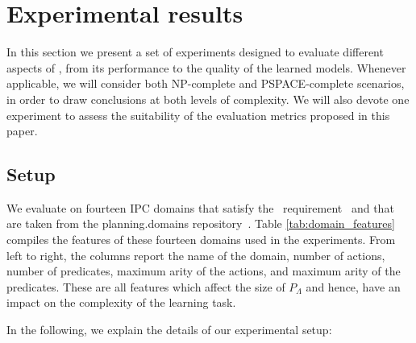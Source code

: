 
\section{Experimental results}
\label{sec:experiments}

In this section we present a set of experiments designed to evaluate different aspects of \FAMA, from its performance to the quality of the learned models. Whenever applicable, we will consider both NP-complete and PSPACE-complete scenarios, in order to draw conclusions at both levels of complexity. We will also devote one experiment to assess the suitability of the evaluation metrics proposed in this paper. 

\subsection{Setup}
We evaluate \FAMA on fourteen IPC domains that satisfy the \strips\ requirement~\cite{fox2003pddl2} and that are taken from the {\sc planning.domains} repository~\cite{muise2016planning}. Table \ref{tab:domain_features} compiles the features of these fourteen domains used in the experiments. From left to right, the columns report the name of the domain, number of actions, number of predicates, maximum arity of the actions, and maximum arity of the predicates. These are all features which affect the size of $P_\Lambda$ and hence, have an impact on the complexity of the learning task. %

In the following, we explain the details of our experimental setup:

